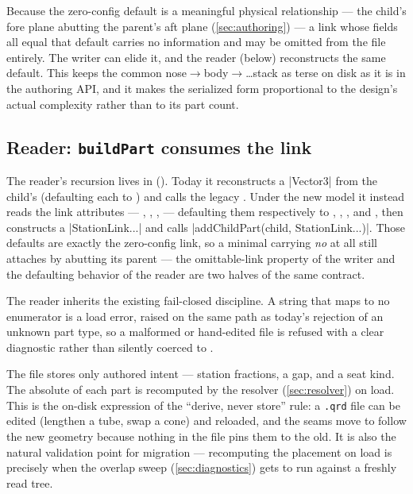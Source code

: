 \begin{keyinsight}
Because the zero-config default is a meaningful physical relationship --- the child's
fore plane abutting the parent's aft plane (\cref{sec:authoring}) --- a link whose
fields all equal that default carries no information and may be omitted from the file
entirely. The writer can elide it, and the reader (below) reconstructs the same default.
This keeps the common nose$\rightarrow$body$\rightarrow$\ldots stack as terse on disk as
it is in the authoring API, and it makes the serialized form proportional to the design's
actual complexity rather than to its part count.
\end{keyinsight}

\subsection{Reader: \texttt{buildPart} consumes the link}

The reader's recursion lives in  ().
Today it reconstructs a \cppinline|Vector3| from the child's
 (defaulting each to ) and calls the legacy
. Under the new model it instead reads the link
attributes --- , , ,  ---
defaulting them respectively to , , , and ,
then constructs a \cppinline|StationLink{...}| and calls
\cppinline|addChildPart(child, StationLink{...})|. Those defaults are exactly the
zero-config link, so a minimal  carrying \emph{no}  at all
still attaches by abutting its parent --- the omittable-link property of the writer and
the defaulting behavior of the reader are two halves of the same contract.

The reader inherits the existing fail-closed discipline. A  string that maps
to no \seat{} enumerator is a load error, raised on the same path as today's
 rejection of an unknown part type, so a malformed or hand-edited file is
refused with a clear diagnostic rather than silently coerced to .

\begin{designrule}
The file stores only authored intent --- station fractions, a gap, and a seat kind. The
absolute  of each part is recomputed by the resolver (\cref{sec:resolver}) on
load. This is the on-disk expression of the ``derive, never store'' rule: a \texttt{.qrd}
file can be edited (lengthen a tube, swap a cone) and reloaded, and the seams move to
follow the new geometry because nothing in the file pins them to the old. It is also the
natural validation point for migration --- recomputing the placement on load is precisely
when the overlap sweep (\cref{sec:diagnostics}) gets to run against a freshly read tree.
\end{designrule}

